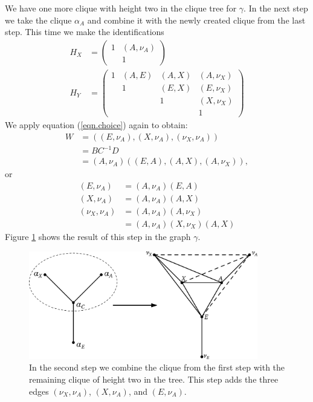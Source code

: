 \documentclass[11pt, a4paper]{article}
\begin{document}
We have one more clique with height two in the clique tree for $\gamma$. In the next step we take the clique $\alpha_A$ and combine it with the newly created clique from the last step. This time we make the identifications
\begin{align}
	H_X & = \begin{pmatrix}
		1 & (A, \nu_A) \\
		& 1
	\end{pmatrix} \\
	H_Y & = \begin{pmatrix}
		1 & (A,E) & (A,X) & (A,\nu_X) \\
		& 1 & (E,X) & (E,\nu_X) \\
		& & 1 & (X,\nu_X) \\
		& & & 1 
	\end{pmatrix}
\end{align}
We apply equation (\ref{eqn.choice}) again to obtain:
\begin{align}
	W & = ( (E,\nu_A), (X,\nu_A), (\nu_X,\nu_A) ) \\
	& = BC^{-1}D \\
	& = (A,\nu_A) ( (E,A), (A,X), (A,\nu_X) ),
\end{align}
or
\begin{align}
	(E,\nu_A) & = (A,\nu_A) (E,A) \\
	(X,\nu_A) & = (A,\nu_A)(A,X)\\
	(\nu_X,\nu_A) & = (A,\nu_A) (A,\nu_X) \\
	& = (A,\nu_A)(X, \nu_X)(A,X)
\end{align}
Figure \ref{fig.secondStep} shows the result of this step in the graph $\gamma$. 

\begin{figure}[hbt]
  \begin{center}
  	\includegraphics[width=10cm]{img/secondStep.png}
  \end{center}
  \caption{In the second step we combine the clique from the first step with the remaining clique of height two in the tree. This step adds the three edges $(\nu_X,\nu_A)$, $(X,\nu_A)$, and $(E,\nu_A)$.}\label{fig.secondStep}
\end{figure}
\end{document}
